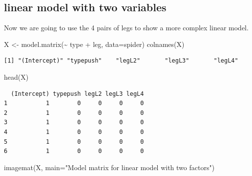 \documentclass[
  letterpaper,
  DIV=11,
  numbers=noendperiod]{scrartcl}
\newenvironment{Shaded}{\begin{snugshade}}{\end{snugshade}}
\newcommand{\AttributeTok}[1]{\textcolor[rgb]{0.40,0.45,0.13}{#1}}
\newcommand{\FunctionTok}[1]{\textcolor[rgb]{0.28,0.35,0.67}{#1}}
\newcommand{\NormalTok}[1]{\textcolor[rgb]{0.00,0.23,0.31}{#1}}
\newcommand{\OtherTok}[1]{\textcolor[rgb]{0.00,0.23,0.31}{#1}}
\newcommand{\SpecialCharTok}[1]{\textcolor[rgb]{0.37,0.37,0.37}{#1}}
\newcommand{\StringTok}[1]{\textcolor[rgb]{0.13,0.47,0.30}{#1}}
\begin{document}
\subsection{linear model with two
variables}\label{linear-model-with-two-variables}

Now we are going to use the 4 pairs of legs to show a more complex
linear model.

\begin{Shaded}
\begin{Highlighting}[]
\NormalTok{X }\OtherTok{\textless{}{-}} \FunctionTok{model.matrix}\NormalTok{(}\SpecialCharTok{\textasciitilde{}}\NormalTok{ type }\SpecialCharTok{+}\NormalTok{ leg, }\AttributeTok{data=}\NormalTok{spider)}
\FunctionTok{colnames}\NormalTok{(X)}
\end{Highlighting}
\end{Shaded}

\begin{verbatim}
[1] "(Intercept)" "typepush"    "legL2"       "legL3"       "legL4"      
\end{verbatim}

\begin{Shaded}
\begin{Highlighting}[]
\FunctionTok{head}\NormalTok{(X)}
\end{Highlighting}
\end{Shaded}

\begin{verbatim}
  (Intercept) typepush legL2 legL3 legL4
1           1        0     0     0     0
2           1        0     0     0     0
3           1        0     0     0     0
4           1        0     0     0     0
5           1        0     0     0     0
6           1        0     0     0     0
\end{verbatim}

\begin{Shaded}
\begin{Highlighting}[]
\FunctionTok{imagemat}\NormalTok{(X, }\AttributeTok{main=}\StringTok{"Model matrix for linear model with two factors"}\NormalTok{)}
\end{Highlighting}
\end{Shaded}
\end{document}

